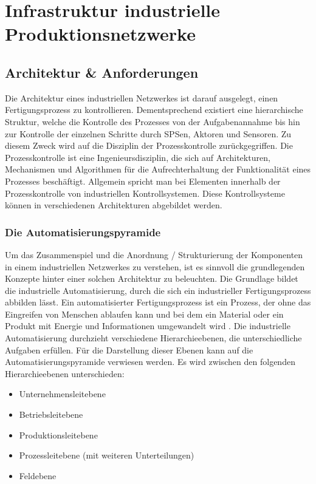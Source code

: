 \section{Infrastruktur industrielle Produktionsnetzwerke}


\subsection{Architektur \&  Anforderungen}
Die Architektur eines industriellen Netzwerkes ist darauf ausgelegt, einen Fertigungsprozess zu kontrollieren. Dementsprechend existiert eine hierarchische Struktur, welche die Kontrolle des Prozesses von der Aufgabenannahme bis hin zur Kontrolle der einzelnen Schritte durch SPSen, Aktoren und Sensoren. Zu diesem Zweck wird auf die Disziplin der Prozesskontrolle zurückgegriffen. Die Prozesskontrolle ist eine Ingenieursdisziplin, die sich auf Architekturen, Mechanismen und Algorithmen für die Aufrechterhaltung der Funktionalität eines Prozesses beschäftigt. Allgemein spricht man bei Elementen innerhalb der Prozesskontrolle von industriellen Kontrollsystemen. Diese Kontrollsysteme können in verschiedenen Architekturen abgebildet werden.

\subsubsection{Die Automatisierungspyramide}
Um das Zusammenspiel und die Anordnung / Strukturierung der Komponenten in einem industriellen Netzwerkes zu verstehen, ist es sinnvoll die grundlegenden Konzepte hinter einer solchen Architektur zu beleuchten. 
Die Grundlage bildet die industrielle Automatisierung, durch die sich ein industrieller Fertigungsprozess abbilden lässt.
Ein automatisierter Fertigungsprozess ist ein Prozess, der ohne das Eingreifen von Menschen ablaufen kann und bei dem ein Material oder ein Produkt mit Energie und Informationen umgewandelt wird \citep{Linke2017}. 
Die industrielle Automatisierung durchzieht verschiedene Hierarchieebenen, die unterschiedliche Aufgaben erfüllen. Für die Darstellung dieser Ebenen kann auf die Automatisierungspyramide verwiesen werden.
Es wird zwischen den folgenden Hierarchieebenen unterschieden:
\begin{itemize}
\item Unternehmensleitebene
\item Betriebsleitebene
\item Produktionsleitebene
\item Prozessleitebene (mit weiteren Unterteilungen)
\item Feldebene
\end{itemize}

